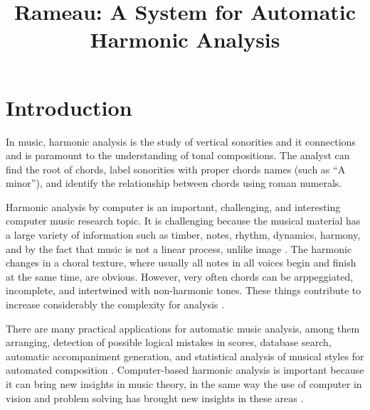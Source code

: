 \documentclass{article}
\title{Rameau: A System for Automatic Harmonic Analysis}
\begin{document}
\maketitle

\begin{abstract}

\end{abstract}

\section{Introduction}
\label{sec:introduction}


In music, harmonic analysis is the study of vertical sonorities and it
connections and is paramount to the understanding of tonal
compositions. The analyst can find the root of chords, label
sonorities with proper chords names (such as ``A minor''), and
identify the relationship between chords using roman numerals.

Harmonic analysis by computer is an important, challenging, and
interesting computer music research topic. It is challenging because
the musical material has a large variety of information such as
timber, notes, rhythm, dynamics, harmony, and by the fact that music is
not a linear process, unlike image \cite{mouton95:numeric}. The
harmonic changes in a choral texture, where usually all notes in all
voices begin and finish at the same time, are obvious. However, very
often chords can be arppeggiated, incomplete, and intertwined with
non-harmonic tones. These things contribute to increase considerably
the complexity for analysis \cite{pardo00:automated}. 

There are many practical applications for automatic music analysis,
among them arranging, detection of possible logical mistakes in
scores, database search, automatic accompaniment generation, and
statistical analysis of musical styles for automated composition
\cite{pardo02:algorithms,temperley99:modeling}. Computer-based
harmonic analysis is important because it can bring new insights in
music theory, in the same way the use of computer in vision and
problem solving has brought new insights in these areas
\cite{temperley99:modeling}.
\end{document}

